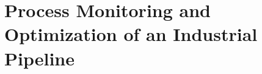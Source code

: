 \documentclass[12pt]{report}
\begin{document}
% 

% 

% 

\printbibliography

\appendix

\chapter{Process Monitoring and Optimization of an Industrial Pipeline}


% 

% 
\end{document}
